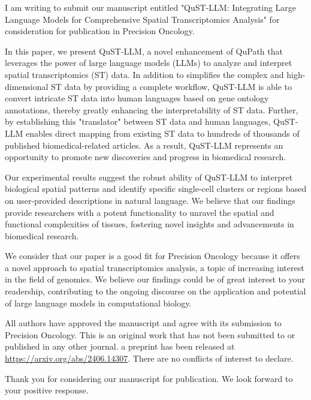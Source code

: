 \documentclass[10pt,stdletter,dateno]{newlfm}
\begin{document}
	\begin{newlfm}
I am writing to submit our manuscript entitled "QuST-LLM: Integrating Large Language Models for Comprehensive Spatial Transcriptomics Analysis" for consideration for publication in Precision Oncology.

In this paper, we present QuST-LLM, a novel enhancement of QuPath that leverages the power of large language models (LLMs) to analyze and interpret spatial transcriptomics (ST) data. In addition to simplifies the complex and high-dimensional ST data by providing a complete workflow, QuST-LLM is able to convert intricate ST data into human languages based on gene ontology annotations, thereby greatly enhancing the interpretability of ST data. 
Further, by establishing this "translator" between ST data and human languages, QuST-LLM enables direct mapping from existing ST data to hundreds of thousands of published biomedical-related articles. As a result, QuST-LLM represents an opportunity to promote new discoveries and progress in biomedical research.

Our experimental results suggest the robust ability of QuST-LLM to interpret biological spatial patterns and identify specific single-cell clusters or regions based on user-provided descriptions in natural language. We believe that our findings provide researchers with a potent functionality to unravel the spatial and functional complexities of tissues, fostering novel insights and advancements in biomedical research.

We consider that our paper is a good fit for Precision Oncology because it offers a novel approach to spatial transcriptomics analysis, a topic of increasing interest in the field of genomics. We believe our findings could be of great interest to your readership, contributing to the ongoing discourse on the application and potential of large language models in computational biology.

All authors have approved the manuscript and agree with its submission to Precision Oncology. This is an original work that has not been submitted to or published in any other journal. a preprint has been released at \url{https://arxiv.org/abs/2406.14307}. There are no conflicts of interest to declare.

Thank you for considering our manuscript for publication. We look forward to your positive response.
		
	\end{newlfm}
\end{document}
